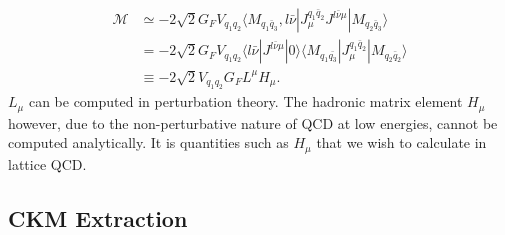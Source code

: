 \documentclass[a4paper,10pt]{article}
\numberwithin{equation}{section}
\begin{document}
\begin{align}
  \nonumber
  \mathcal{M} & \simeq -2\sqrt{2} G_F V_{q_1q_2} \langle M_{q_1\bar{q}_3}, l\bar{\nu} | J_{\mu}^{q_1\bar{q}_2} J^{l\bar{\nu} \mu} | M_{q_2\bar{q}_3} \rangle \\
  \nonumber
  & = -2\sqrt{2} G_F V_{q_1q_2} \langle l\bar{\nu} | J^{l\bar{\nu} \mu} | 0 \rangle \langle M_{q_1\bar{q_3}} | J_{\mu}^{q_1\bar{q}_2} | M_{q_2\bar{q}_2} \rangle \\
  & \equiv -2\sqrt{2} V_{q_1q_2} G_F L^{\mu} H_{\mu}.
  \label{eq:LH}
\end{align}
$L_{\mu}$ can be computed in perturbation theory. The hadronic matrix element $H_{\mu}$ however, due to the non-perturbative nature of QCD at low energies,
cannot be computed analytically. It is quantities such as $H_{\mu}$ that we wish to calculate in lattice QCD.

\subsection{CKM Extraction}
\end{document}
